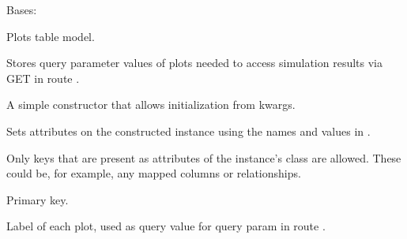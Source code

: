 \documentclass[a4paper,landscape,10pt,english]{sphinxmanual}
\begin{document}
\begin{fulllineitems}
\label{\detokenize{code_docs/simulation_API.model:simulation_API.model.models.PlotDB}}
Bases: 

Plots table model.

Stores query parameter values of plots needed to access simulation
results via GET in route
.

\begin{fulllineitems}
\label{\detokenize{code_docs/simulation_API.model:simulation_API.model.models.PlotDB.__init__}}
A simple constructor that allows initialization from kwargs.

Sets attributes on the constructed instance using the names and
values in .

Only keys that are present as
attributes of the instance’s class are allowed. These could be,
for example, any mapped columns or relationships.

\end{fulllineitems}


\begin{fulllineitems}
\label{\detokenize{code_docs/simulation_API.model:simulation_API.model.models.PlotDB.plot_id}}
Primary key.

\end{fulllineitems}


\begin{fulllineitems}
\label{\detokenize{code_docs/simulation_API.model:simulation_API.model.models.PlotDB.plot_query_value}}
Label of each plot, used as query value for query param  in
route .


\end{fulllineitems}
\end{fulllineitems}
\end{document}
